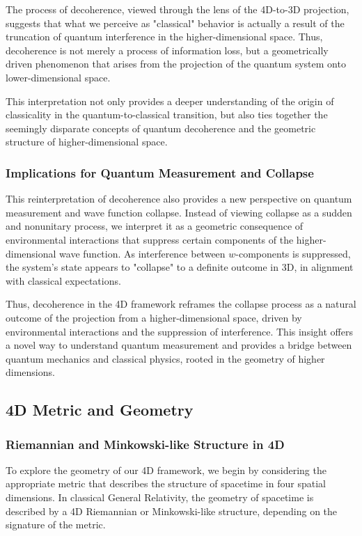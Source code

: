 \documentclass[12pt]{article}
\begin{document}
The process of decoherence, viewed through the lens of the 4D-to-3D projection, suggests that what we perceive as "classical" behavior is actually a result of the truncation of quantum interference in the higher-dimensional space. Thus, decoherence is not merely a process of information loss, but a geometrically driven phenomenon that arises from the projection of the quantum system onto lower-dimensional space.

This interpretation not only provides a deeper understanding of the origin of classicality in the quantum-to-classical transition, but also ties together the seemingly disparate concepts of quantum decoherence and the geometric structure of higher-dimensional space.

\subsubsection{Implications for Quantum Measurement and Collapse}

This reinterpretation of decoherence also provides a new perspective on quantum measurement and wave function collapse. Instead of viewing collapse as a sudden and nonunitary process, we interpret it as a geometric consequence of environmental interactions that suppress certain components of the higher-dimensional wave function. As interference between \( w \)-components is suppressed, the system's state appears to "collapse" to a definite outcome in 3D, in alignment with classical expectations.

Thus, decoherence in the 4D framework reframes the collapse process as a natural outcome of the projection from a higher-dimensional space, driven by environmental interactions and the suppression of interference. This insight offers a novel way to understand quantum measurement and provides a bridge between quantum mechanics and classical physics, rooted in the geometry of higher dimensions.


\subsection{4D Metric and Geometry}

\subsubsection{Riemannian and Minkowski-like Structure in 4D}

To explore the geometry of our 4D framework, we begin by considering the appropriate metric that describes the structure of spacetime in four spatial dimensions. In classical General Relativity, the geometry of spacetime is described by a 4D Riemannian or Minkowski-like structure, depending on the signature of the metric.
\end{document}
